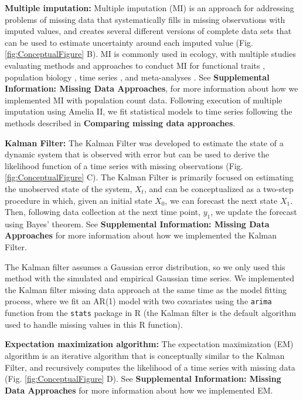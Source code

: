\documentclass{article}
\begin{document}
\noindent\textbf{Multiple imputation: }Multiple imputation (MI) is an approach for addressing problems of missing data that systematically fills in missing observations with imputed values, and creates several different versions of complete data sets that can be used to estimate uncertainty around each imputed value (Fig. \ref{fig:ConceptualFigure} B). MI is commonly used in ecology, with multiple studies evaluating methods and approaches to conduct MI for functional traits \citep{taugourdeau_filling_2014,johnson_handling_2021,penone_imputation_2014}, population biology \citep{onkelinx_working_2017}, time series \citep{hui_gap-filling_2004}, and meta-analyses \citep{ellington_using_2015}.  See \textbf{Supplemental Information: Missing Data Approaches}, for more information about how we implemented MI with population count data.  Following execution of multiple imputation using Amelia II, we fit statistical models to time series following the methods described in \textbf{Comparing missing data approaches}. 


\noindent\textbf{Kalman Filter:} The Kalman Filter was developed to estimate the state of a dynamic system that is observed with error but can be used to derive the likelihood function of a time series with missing observations (Fig. \ref{fig:ConceptualFigure} C). The Kalman Filter is primarily focused on estimating the unobserved state of the system, $X_t$, and can be conceptualized as a two-step procedure in which, given an initial state $X_0$, we can forecast the next state $X_1$. Then, following data collection at the next time point, $y_1$, we update the forecast using Bayes' theorem. 
See \textbf{Supplemental Information: Missing Data Approaches} for more information about how we implemented the Kalman Filter.

The Kalman filter assumes a Gaussian error distribution, so we only used this method with the simulated and empirical Gaussian time series. We implemented the Kalman filter missing data approach at the same time as the model fitting process, where we fit an AR(1) model with two covariates using the \texttt{arima} function from the \texttt{stats} package in R \citep{r_2021} (the Kalman filter is the default algorithm used to handle missing values in this R function). 


\noindent\textbf{Expectation maximization algorithm: }The expectation maximization (EM) algorithm is an iterative algorithm that is conceptually similar to the Kalman Filter, and recursively computes the likelihood of a time series with missing data (Fig. \ref{fig:ConceptualFigure} D). See \textbf{Supplemental Information: Missing Data Approaches} for more information about how we implemented EM.
\end{document}

